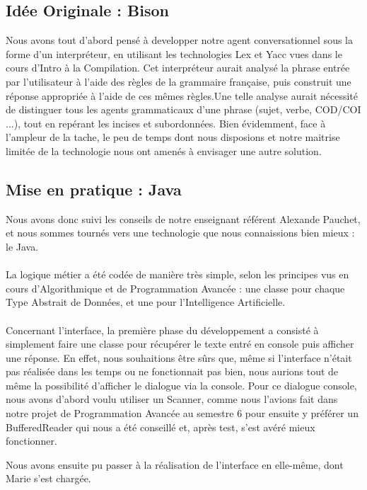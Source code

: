 \subsection{Idée Originale : Bison} Nous avons tout d'abord pensé à developper notre agent conversationnel sous la forme d'un interpréteur, en utilisant les technologies Lex et Yacc vues dans le cours d'Intro à la Compilation. Cet interpréteur aurait analysé la phrase entrée par l'utilisateur à l'aide des règles de la grammaire française, puis construit une réponse appropriée à l'aide de ces mêmes règles.Une telle analyse aurait nécessité de distinguer tous les agents grammaticaux d'une phrase (sujet, verbe, COD/COI ...), tout en repérant les incises et subordonnées. Bien évidemment, face à  l'ampleur de la tache, le peu de temps dont nous disposions et notre maitrise limitée de la technologie nous ont amenés à envisager une autre solution.

\subsection{Mise en pratique : Java}
Nous avons donc suivi les conseils de notre enseignant référent Alexande Pauchet, et nous sommes tournés vers une technologie que nous connaissions bien mieux : le Java.
\paragraph{}La logique métier a été codée de manière très simple, selon les principes vus en cours d'Algorithmique et de Programmation Avancée : une classe pour chaque Type Abstrait de Données, et une pour l'Intelligence Artificielle.
\paragraph{}Concernant l'interface, la première phase du développement a consisté à simplement faire une classe pour récupérer le texte entré en console puis afficher une réponse. En effet, nous souhaitions être sûrs que, même si l'interface n'était pas réalisée dans les temps ou ne fonctionnait pas bien, nous aurions tout de même la possibilité d'afficher le dialogue via la console. 
Pour ce dialogue console, nous avons d'abord voulu utiliser un Scanner, comme nous l'avions fait dans notre projet de Programmation Avancée au semestre 6 pour ensuite y préférer un BufferedReader qui nous a été conseillé et, après test, s'est avéré mieux fonctionner.

Nous avons ensuite pu passer à la réalisation de l'interface en elle-même, dont Marie s'est chargée. 
